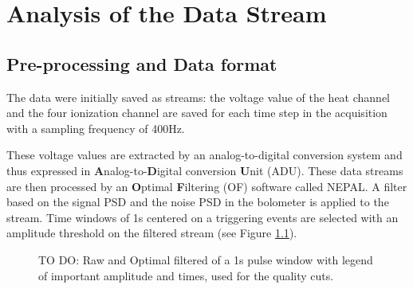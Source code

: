 
\chapter{Analysis of the Data Stream} %

\label{ChapterAnalysis} %


%
%
%
%
%
%





\section{Pre-processing and Data format}
\label{par:data-format}
\label{par:of-processing}

The data were initially saved as streams: the voltage value of the heat channel and the four ionization channel are saved for each time step in the acquisition with a sampling frequency of 400Hz. 

These voltage values are extracted by an analog-to-digital conversion system and thus expressed in \textbf{A}nalog-to-\textbf{D}igital conversion \textbf{U}nit (ADU).
These data streams are then processed by an \textbf{O}ptimal \textbf{F}iltering (OF) software called NEPAL. A filter based on the signal PSD and the noise PSD in the bolometer is applied to the stream. Time windows of 1s centered on a triggering events are selected with an amplitude threshold on the filtered stream (see Figure \ref{fig:raw-of-signal}).

\begin{figure}
\centering
\caption{TO DO: Raw and Optimal filtered of a 1s pulse window with legend of important amplitude and times, used for the quality cuts.}
\label{fig:raw-of-signal}
\end{figure}

